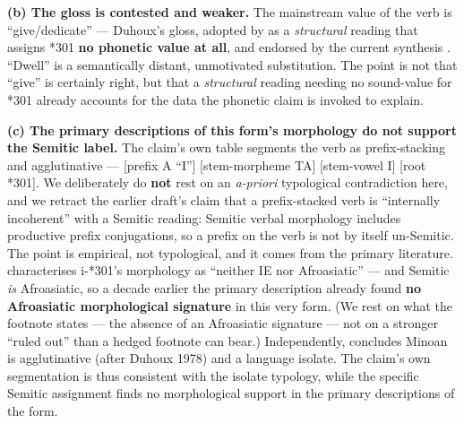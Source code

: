 \textbf{(b) The gloss is contested and weaker.} The mainstream value of the
verb is ``give/dedicate'' --- Duhoux's \citeyearpar{duhoux1992} gloss,
adopted by \citet{davis2013} as a \emph{structural} reading that assigns
*301 \textbf{no phonetic value at all}, and endorsed by the current
synthesis \citep[\S7.2]{salgarella2025}. ``Dwell'' is a semantically
distant, unmotivated substitution. The point is not that ``give'' is
certainly right, but that a \emph{structural} reading needing no
sound-value for *301 already accounts for the data the phonetic claim is
invoked to explain.

\textbf{(c) The primary descriptions of this form's morphology do not
support the Semitic label.} The claim's own table segments the verb as
prefix-stacking and agglutinative --- [prefix A ``I''] [stem-morpheme TA]
[stem-vowel I] [root *301]. We deliberately do \textbf{not} rest on an
\emph{a-priori} typological contradiction here, and we retract the earlier
draft's claim that a prefix-stacked verb is ``internally incoherent'' with
a Semitic reading: Semitic verbal morphology includes productive prefix
conjugations, so a prefix on the verb is not by itself un-Semitic. The
point is empirical, not typological, and it comes from the primary
literature. \citet[p.~38 n.~13]{davis2013} characterises i-*301's
morphology as ``neither IE nor Afroasiatic'' --- and Semitic \emph{is}
Afroasiatic, so a decade earlier the primary description already found
\textbf{no Afroasiatic morphological signature} in this very form. (We rest
on what the footnote states --- the absence of an Afroasiatic signature ---
not on a stronger ``ruled out'' than a hedged footnote can bear.)
Independently, \citet[\S8]{salgarella2025} concludes Minoan is
agglutinative (after Duhoux 1978) and a language isolate. The claim's own
segmentation is thus consistent with the isolate typology, while the
specific Semitic assignment finds no morphological support in the primary
descriptions of the form.

